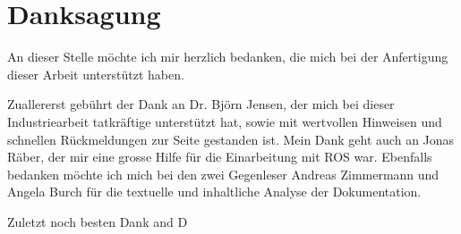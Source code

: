\section{Danksagung}
An dieser Stelle möchte ich mir herzlich bedanken, die mich bei der Anfertigung dieser Arbeit unterstützt haben.

Zuallererst gebührt der Dank an Dr. Björn Jensen, der mich bei dieser Industriearbeit tatkräftige unterstützt hat, sowie mit wertvollen Hinweisen und schnellen Rückmeldungen zur Seite gestanden ist.
Mein Dank geht auch an Jonas Räber, der mir eine grosse Hilfe für die Einarbeitung mit \ac{ROS} war. Ebenfalls bedanken möchte ich mich bei den zwei Gegenleser Andreas Zimmermann und Angela Burch für die textuelle und inhaltliche Analyse der Dokumentation.

Zuletzt noch besten Dank and D 

